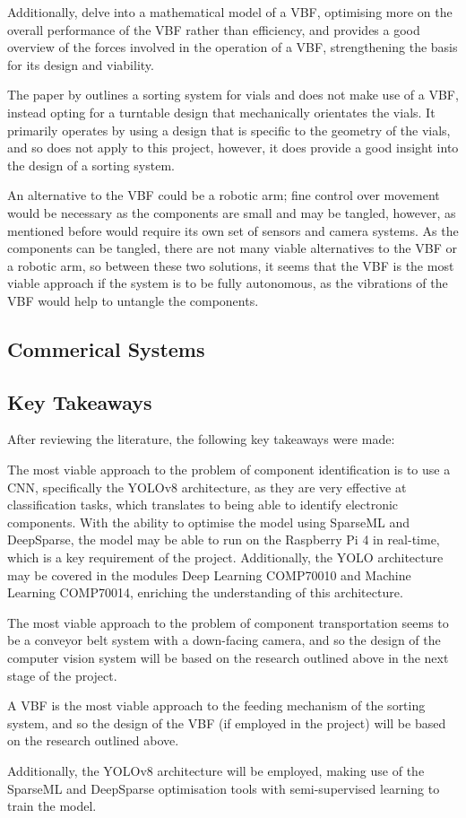 Additionally, \citet{REINHART2010191} delve into a mathematical model of a VBF, optimising more on the overall performance of the VBF rather than efficiency, and \citet{ForceAnalysisofVibratoryBowlFeeder}
provides a good overview of the forces involved in the operation of a VBF, strengthening the basis for its design and viability.

The paper by \citet{zhang2019design} outlines a sorting system for vials and does not make use of a VBF, instead opting for a turntable design that mechanically orientates the vials. It primarily operates
by using a design that is specific to the geometry of the vials, and so does not apply to this project, however, it does provide a good insight into the design of a sorting system.

An alternative to the VBF could be a robotic arm; fine control over movement would be necessary as the components are small and may be tangled, however, as mentioned before would require its own set of sensors and camera systems.
As the components can be tangled, there are not many viable alternatives to the VBF or a robotic arm, so between these two solutions, it seems that the VBF is the most viable approach if the system is to be fully autonomous, as the vibrations of the VBF would help to untangle the components.
\subsection{Commerical Systems}
\subsection{Key Takeaways}
After reviewing the literature, the following key takeaways were made:

The most viable approach to the problem of component identification is to use a CNN, specifically the YOLOv8 architecture, as they are very effective at classification tasks, which translates to being able to identify electronic components. With the ability
to optimise the model using SparseML and DeepSparse, the model may be able to run on the Raspberry Pi 4 in real-time, which is a key requirement of the project.
Additionally, the YOLO architecture may be covered in the modules Deep Learning COMP70010 and Machine Learning COMP70014, enriching the understanding of this architecture.

The most viable approach to the problem of component transportation seems to be a conveyor belt system with a down-facing camera, and so the design of the computer vision system will be based on the research outlined above in the next stage of the project.

A VBF is the most viable approach to the feeding mechanism of the sorting system, and so the design of the VBF (if employed in the project) will be based on the research outlined above.

Additionally, the YOLOv8 architecture will be employed, making use of the SparseML and DeepSparse optimisation tools with semi-supervised learning to train the model.
